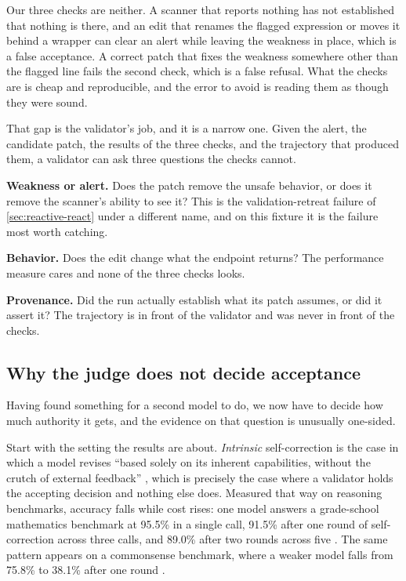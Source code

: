 Our three checks are neither. A scanner that reports nothing has not established that nothing is
there, and an edit that renames the flagged expression or moves it behind a wrapper can clear an
alert while leaving the weakness in place, which is a false acceptance. A correct patch that fixes
the weakness somewhere other than the flagged line fails the second check, which is a false refusal.
What the checks are is cheap and reproducible, and the error to avoid is reading them as though they
were sound.

That gap is the validator's job, and it is a narrow one. Given the alert, the candidate patch, the
results of the three checks, and the trajectory that produced them, a validator can ask three
questions the checks cannot.

\bi

\item \textbf{Weakness or alert.} Does the patch remove the unsafe behavior, or does it remove the
scanner's ability to see it? This is the validation-retreat failure of \cref{sec:reactive-react}
under a different name, and on this fixture it is the failure most worth catching.

\item \textbf{Behavior.} Does the edit change what the endpoint returns? The performance measure
cares and none of the three checks looks.

\item \textbf{Provenance.} Did the run actually establish what its patch assumes, or did it assert
it? The trajectory is in front of the validator and was never in front of the checks.

\ei

\subsection{Why the judge does not decide acceptance}
\label{sec:validation-evidence}

Having found something for a second model to do, we now have to decide how much authority it gets,
and the evidence on that question is unusually one-sided.

Start with the setting the results are about. \emph{Intrinsic} self-correction is the case in which
a model revises ``based solely on its inherent capabilities, without the crutch of external
feedback'' \citep[\S1]{huang2024selfcorrect}, which is precisely the case where a validator holds
the accepting decision and nothing else does. Measured that way on reasoning benchmarks, accuracy
falls while cost rises: one model answers a grade-school mathematics benchmark at 95.5\% in a single
call, 91.5\% after one round of self-correction across three calls, and 89.0\% after two rounds
across five \citep[Table~3]{huang2024selfcorrect}. The same pattern appears on a commonsense
benchmark, where a weaker model falls from 75.8\% to 38.1\% after one round
\citep[Table~3]{huang2024selfcorrect}.

